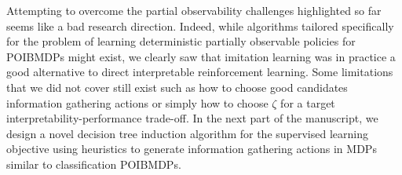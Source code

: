 Attempting to overcome the partial observability challenges highlighted so far seems like a bad research direction.
Indeed, while algorithms tailored specifically for the problem of learning deterministic partially observable policies for POIBMDPs might exist, we clearly saw that imitation learning was in practice a good alternative to direct interpretable reinforcement learning.
Some limitations that we did not cover still exist such as how to choose good candidates information gathering actions or simply how to choose $\zeta$ for a target interpretability-performance trade-off.
In the next part of the manuscript, we design a novel decision tree induction algorithm for the supervised learning objective using heuristics to generate information gathering actions in MDPs similar to classification POIBMDPs.